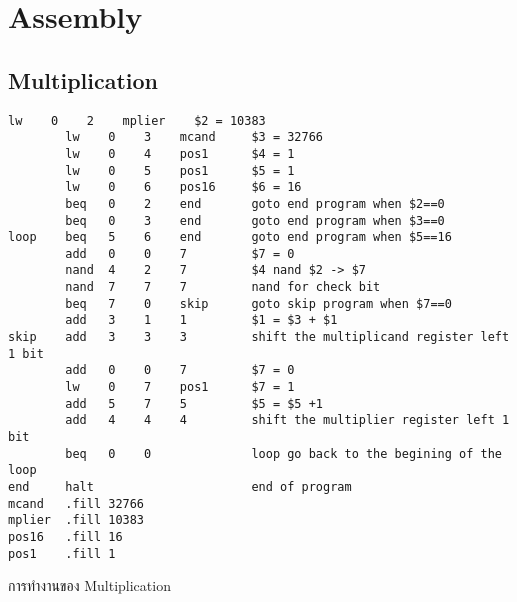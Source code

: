\documentclass[14pt]{article}
\begin{document}
\newpage
\section{Assembly}
\subsection{Multiplication}
\begin{lstlisting}[style=assembly]
        lw    0    2    mplier    $2 = 10383
        lw    0    3    mcand     $3 = 32766
        lw    0    4    pos1      $4 = 1
        lw    0    5    pos1      $5 = 1
        lw    0    6    pos16     $6 = 16
        beq   0    2    end       goto end program when $2==0
        beq   0    3    end       goto end program when $3==0
loop    beq   5    6    end       goto end program when $5==16
        add   0    0    7         $7 = 0
        nand  4    2    7         $4 nand $2 -> $7
        nand  7    7    7         nand for check bit
        beq   7    0    skip      goto skip program when $7==0
        add   3    1    1         $1 = $3 + $1
skip    add   3    3    3         shift the multiplicand register left 1 bit
        add   0    0    7         $7 = 0
        lw    0    7    pos1      $7 = 1
        add   5    7    5         $5 = $5 +1
        add   4    4    4         shift the multiplier register left 1 bit
        beq   0    0              loop go back to the begining of the loop
end     halt                      end of program
mcand   .fill 32766
mplier  .fill 10383
pos16   .fill 16
pos1    .fill 1
\end{lstlisting}
การทำงานของ Multiplication
\end{document}
